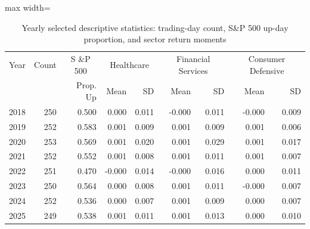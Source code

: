 \begin{table}[htbp]
\centering
\begin{adjustbox}{max width=\linewidth}
\begin{tabular}{lrr|rr|rr|rr}
\hline
Year & Count & \multicolumn{1}{c|}{S \&P 500} & \multicolumn{2}{c|}{Healthcare} & \multicolumn{2}{c|}{Financial Services} & \multicolumn{2}{c}{Consumer Defensive} \\
 &  & Prop. Up & Mean & SD & Mean & SD & Mean & SD \\
\hline
2018 & 250 & 0.500 & 0.000 & 0.011 & -0.000 & 0.011 & -0.000 & 0.009 \\
2019 & 252 & 0.583 & 0.001 & 0.009 & 0.001 & 0.009 & 0.001 & 0.006 \\
2020 & 253 & 0.569 & 0.001 & 0.020 & 0.001 & 0.029 & 0.001 & 0.017 \\
2021 & 252 & 0.552 & 0.001 & 0.008 & 0.001 & 0.011 & 0.001 & 0.007 \\
2022 & 251 & 0.470 & -0.000 & 0.014 & -0.000 & 0.016 & 0.000 & 0.011 \\
2023 & 250 & 0.564 & 0.000 & 0.008 & 0.001 & 0.011 & -0.000 & 0.007 \\
2024 & 252 & 0.536 & 0.000 & 0.007 & 0.001 & 0.009 & 0.000 & 0.007 \\
2025 & 249 & 0.538 & 0.001 & 0.011 & 0.001 & 0.013 & 0.000 & 0.010 \\
\hline
\end{tabular}
\end{adjustbox}
\caption{Yearly selected descriptive statistics: trading-day count, S\&P 500 up-day proportion, and sector return moments}
\label{tab:descriptive_stats}
\end{table}
